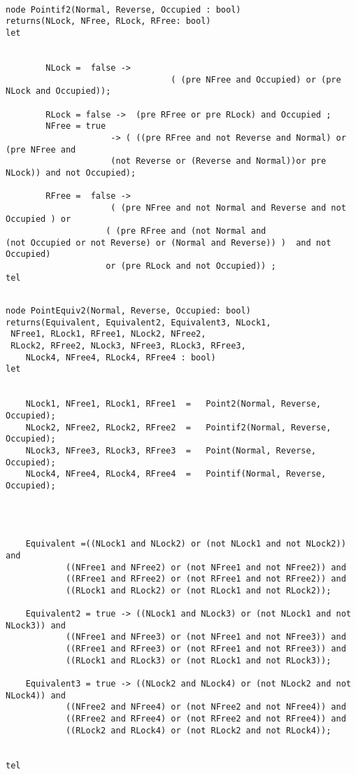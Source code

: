 \begin{verbatim}

node Pointif2(Normal, Reverse, Occupied : bool)
returns(NLock, NFree, RLock, RFree: bool)
let


		NLock =  false ->
								 ( (pre NFree and Occupied) or (pre NLock and Occupied));
								 
		RLock = false ->  (pre RFree or pre RLock) and Occupied ;
		NFree = true
					 -> ( ((pre RFree and not Reverse and Normal) or (pre NFree and
					 (not Reverse or (Reverse and Normal))or pre NLock)) and not Occupied);
		
		RFree =  false -> 
					 ( (pre NFree and not Normal and Reverse and not Occupied ) or  
					( (pre RFree and (not Normal and
(not Occupied or not Reverse) or (Normal and Reverse)) )  and not Occupied) 
					or (pre RLock and not Occupied)) ;
tel

\end{verbatim}

\begin{verbatim}

node PointEquiv2(Normal, Reverse, Occupied: bool)
returns(Equivalent, Equivalent2, Equivalent3, NLock1,
 NFree1, RLock1, RFree1, NLock2, NFree2,
 RLock2, RFree2, NLock3, NFree3, RLock3, RFree3,
	NLock4, NFree4, RLock4, RFree4 : bool)
let


	NLock1, NFree1, RLock1, RFree1	= 	Point2(Normal, Reverse, Occupied);
	NLock2, NFree2, RLock2, RFree2	= 	Pointif2(Normal, Reverse, Occupied);
	NLock3, NFree3, RLock3, RFree3  = 	Point(Normal, Reverse, Occupied);
	NLock4, NFree4, RLock4, RFree4 	= 	Pointif(Normal, Reverse, Occupied);
	
	
	
	
	Equivalent =((NLock1 and NLock2) or (not NLock1 and not NLock2)) and
			((NFree1 and NFree2) or (not NFree1 and not NFree2)) and
			((RFree1 and RFree2) or (not RFree1 and not RFree2)) and
			((RLock1 and RLock2) or (not RLock1 and not RLock2));
	
	Equivalent2 = true -> ((NLock1 and NLock3) or (not NLock1 and not NLock3)) and
			((NFree1 and NFree3) or (not NFree1 and not NFree3)) and
			((RFree1 and RFree3) or (not RFree1 and not RFree3)) and
			((RLock1 and RLock3) or (not RLock1 and not RLock3));
	
	Equivalent3 = true -> ((NLock2 and NLock4) or (not NLock2 and not NLock4)) and
			((NFree2 and NFree4) or (not NFree2 and not NFree4)) and
			((RFree2 and RFree4) or (not RFree2 and not RFree4)) and
			((RLock2 and RLock4) or (not RLock2 and not RLock4));
		
	
tel

\end{verbatim}

